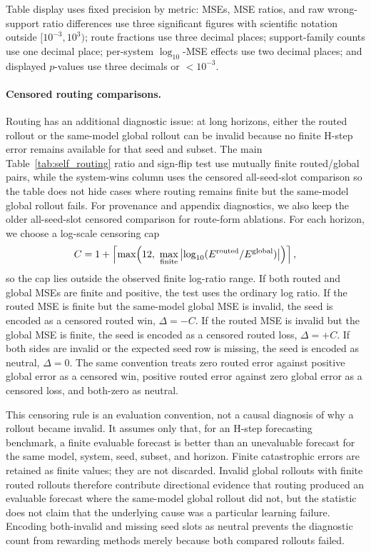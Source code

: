 Table display uses fixed precision by metric: MSEs, MSE ratios, and raw wrong-support ratio differences use three significant figures with scientific notation outside \([10^{-3},10^3)\); route fractions use three decimal places; support-family counts use one decimal place; per-system \(\log_{10}\)-MSE effects use two decimal places; and displayed \(p\)-values use three decimals or \(<10^{-3}\).

\paragraph{Censored routing comparisons.}
Routing has an additional diagnostic issue: at long horizons, either the routed rollout or the same-model global rollout can be invalid because no finite H-step error remains available for that seed and subset. The main Table~\ref{tab:self_routing} ratio and sign-flip test use mutually finite routed/global pairs, while the system-wins column uses the censored all-seed-slot comparison so the table does not hide cases where routing remains finite but the same-model global rollout fails. For provenance and appendix diagnostics, we also keep the older all-seed-slot censored comparison for route-form ablations. For each horizon, we choose a log-scale censoring cap
\begin{equation}
  C
  =
  1+\left\lceil \max\!\left(12,\ \max_{\rm finite}\left|\log_{10}(E^{\rm routed}/E^{\rm global})\right|\right)\right\rceil,
\end{equation}
so the cap lies outside the observed finite log-ratio range. If both routed and global MSEs are finite and positive, the test uses the ordinary log ratio. If the routed MSE is finite but the same-model global MSE is invalid, the seed is encoded as a censored routed win, $\Delta=-C$. If the routed MSE is invalid but the global MSE is finite, the seed is encoded as a censored routed loss, $\Delta=+C$. If both sides are invalid or the expected seed row is missing, the seed is encoded as neutral, $\Delta=0$. The same convention treats zero routed error against positive global error as a censored win, positive routed error against zero global error as a censored loss, and both-zero as neutral.

This censoring rule is an evaluation convention, not a causal diagnosis of why a rollout became invalid. It assumes only that, for an H-step forecasting benchmark, a finite evaluable forecast is better than an unevaluable forecast for the same model, system, seed, subset, and horizon. Finite catastrophic errors are retained as finite values; they are not discarded. Invalid global rollouts with finite routed rollouts therefore contribute directional evidence that routing produced an evaluable forecast where the same-model global rollout did not, but the statistic does not claim that the underlying cause was a particular learning failure. Encoding both-invalid and missing seed slots as neutral prevents the diagnostic count from rewarding methods merely because both compared rollouts failed.

